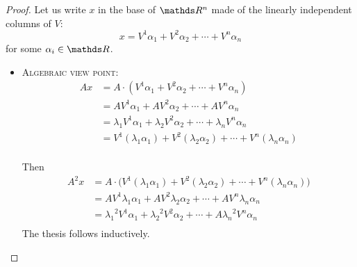 \documentclass[computationalMathematics.tex]{subfiles}
\begin{document}
\begin{proof}
  Let us write $x$ in the base of $\R^n$ made of the linearly independent columns of $V$:
  \[
x = V^1 \alpha_1 + V^2 \alpha_2 + \cdots + V^n \alpha_n
  \]
  for some $\alpha_i \in \R$.

 \begin{itemize}
   \item \textsc{Algebraic view point:}
  \begin{equation}
    \begin{split}
      Ax &= A \cdot ( V^1 \alpha_1 + V^2 \alpha_2 + \cdots + V^n \alpha_n)\\
      &= A V^1 \alpha_1 + A V^2 \alpha_2 + \cdots + A V^n \alpha_n\\
      & = \lambda_1 V^1 \alpha_1 + \lambda_2 V^2 \alpha_2 + \cdots + \lambda_n V^n \alpha_n\\
      &= V^1 (\lambda_1 \alpha_1) + V^2 (\lambda_2 \alpha_2) + \cdots + V^n (\lambda_n \alpha_n)\\
    \end{split}
  \end{equation}

  Then
 \begin{equation}
    \begin{split}
      A^2 x &= A \cdot \Big (V^1 (\lambda_1 \alpha_1) + V^2 (\lambda_2 \alpha_2) + \cdots + V^n (\lambda_n \alpha_n) \Big )\\
      &= A V^1 \lambda_1 \alpha_1 + A V^2 \lambda_2 \alpha_2 + \cdots + A V^n \lambda_n \alpha_n\\
      &= {\lambda_1}^2 V^1 \alpha_1 + {\lambda_2}^2 V^2 \alpha_2 + \cdots + A {\lambda_n}^2 V^n \alpha_n\\
    \end{split}
  \end{equation}
The thesis follows inductively.
  

\end{itemize}
\end{proof}
\end{document}
